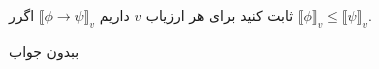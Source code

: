 ثابت کنید برای هر ارزیاب $v$ داریم
$\llbracket \phi\to\psi\rrbracket_v$
اگرر
$\llbracket\phi\rrbracket_v\leq\llbracket\psi\rrbracket_v$.
\begin{ans}
ببدون جواب
\end{ans}
